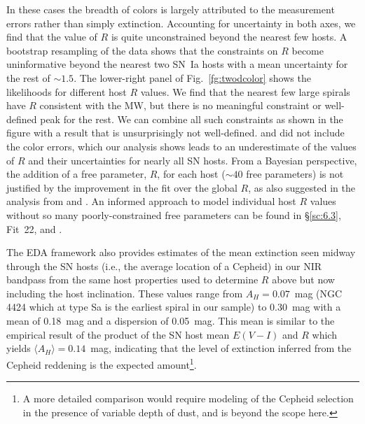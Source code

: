 \documentclass[12pt]{aastex631}
\begin{document}
\begin{appendices}
In these cases the breadth of colors is largely attributed to the measurement errors rather than simply extinction. Accounting for uncertainty in both axes, we find that the value of $R$ is quite unconstrained beyond the nearest few hosts.  A bootstrap resampling of the data shows that the constraints on $R$ become uninformative beyond the nearest two SN~Ia hosts with a mean uncertainty for the rest of $\sim 1.5$.  The lower-right panel of Fig.~\ref{fg:twodcolor} shows the likelihoods for different host $R$ values.  We find that the nearest few large spirals have $R$ consistent with the MW, but there is no meaningful constraint or well-defined peak for the rest.  We can combine all such constraints as shown in the figure with a result that is unsurprisingly not well-defined.   \citet{Mortsell:2021} and \citet{Peri:2021} did not include the color errors, which our analysis shows leads to an underestimate of the values of $R$ and their uncertainties for nearly all SN hosts.  From a Bayesian perspective, the addition of a free parameter, $R$, for each host ($\sim 40$ free parameters) is not justified by the improvement in the fit over the global $R$, as also suggested in the analysis from \citet{Mortsell:2021} and \citet{Follin:2017}.  An informed approach to model individual host $R$ values without so many poorly-constrained free parameters can be found in \S\ref{sc:6.3}, Fit~22, and \citet{Hahn:2021}.

The EDA framework also provides estimates of the mean extinction seen midway through the SN hosts (i.e., the average location of a Cepheid) in our NIR bandpass from the same host properties used to determine $R$ above but now including the host inclination.  These values range from $A_H= 0.07$~mag (NGC$\,$4424 which at type Sa is the earliest spiral in our sample) to 0.30~mag with a mean of 0.18~mag and a dispersion of 0.05~mag.  This mean is similar to the empirical result of the product of the SN host mean $E(V\!-\!I)$ and $R$ which yields $\langle A_H\rangle=0.14$~mag, indicating that the level of extinction inferred from the Cepheid reddening is the expected amount\footnote{A more detailed comparison would require modeling of the Cepheid selection in the presence of variable depth of dust, and is beyond the scope here.}.


\end{appendices}
\end{document}

